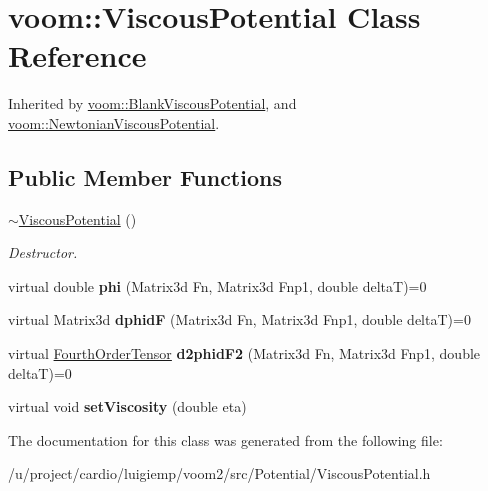 \hypertarget{classvoom_1_1_viscous_potential}{
\section{voom::ViscousPotential Class Reference}
\label{classvoom_1_1_viscous_potential}
}


Inherited by \hyperlink{classvoom_1_1_blank_viscous_potential}{voom::BlankViscousPotential}, and \hyperlink{classvoom_1_1_newtonian_viscous_potential}{voom::NewtonianViscousPotential}.\subsection*{Public Member Functions}
\begin{DoxyCompactItemize}
\item 
\hypertarget{classvoom_1_1_viscous_potential_aba85c75a536cc0cf6affc5cc731cfde4}{
\hyperlink{classvoom_1_1_viscous_potential_aba85c75a536cc0cf6affc5cc731cfde4}{$\sim$ViscousPotential} ()}
\label{classvoom_1_1_viscous_potential_aba85c75a536cc0cf6affc5cc731cfde4}

\begin{DoxyCompactList}\small\item\em Destructor. \item\end{DoxyCompactList}\item 
\hypertarget{classvoom_1_1_viscous_potential_a78e49130cc85eb0432e67498f00c0213}{
virtual double {\bfseries phi} (Matrix3d Fn, Matrix3d Fnp1, double deltaT)=0}
\label{classvoom_1_1_viscous_potential_a78e49130cc85eb0432e67498f00c0213}

\item 
\hypertarget{classvoom_1_1_viscous_potential_af1f930b4408e784dea155813d751ffb7}{
virtual Matrix3d {\bfseries dphidF} (Matrix3d Fn, Matrix3d Fnp1, double deltaT)=0}
\label{classvoom_1_1_viscous_potential_af1f930b4408e784dea155813d751ffb7}

\item 
\hypertarget{classvoom_1_1_viscous_potential_a2151290d9ae261d22dab19bbf0c84b67}{
virtual \hyperlink{classvoom_1_1_fourth_order_tensor}{FourthOrderTensor} {\bfseries d2phidF2} (Matrix3d Fn, Matrix3d Fnp1, double deltaT)=0}
\label{classvoom_1_1_viscous_potential_a2151290d9ae261d22dab19bbf0c84b67}

\item 
\hypertarget{classvoom_1_1_viscous_potential_a8e927bf877a5059c16454f64de855cc2}{
virtual void {\bfseries setViscosity} (double eta)}
\label{classvoom_1_1_viscous_potential_a8e927bf877a5059c16454f64de855cc2}

\end{DoxyCompactItemize}


The documentation for this class was generated from the following file:\begin{DoxyCompactItemize}
\item 
/u/project/cardio/luigiemp/voom2/src/Potential/ViscousPotential.h\end{DoxyCompactItemize}
